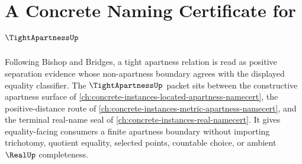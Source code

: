 \chapter{A Concrete Naming Certificate for $\TightApartnessUp$}
\label{ch:concrete-instances-tight-apartness-namecert}

Following Bishop and Bridges, a tight apartness relation is read as positive separation evidence whose non-apartness boundary agrees with the displayed equality classifier. The $\TightApartnessUp$ packet sits between the constructive apartness surface of \autoref{ch:concrete-instances-located-apartness-namecert}, the positive-distance route of \autoref{ch:concrete-instances-metric-apartness-namecert}, and the terminal real-name seal of \autoref{ch:concrete-instances-real-namecert}. It gives equality-facing consumers a finite apartness boundary without importing trichotomy, quotient equality, selected points, countable choice, or ambient $\RealUp$ completeness.

